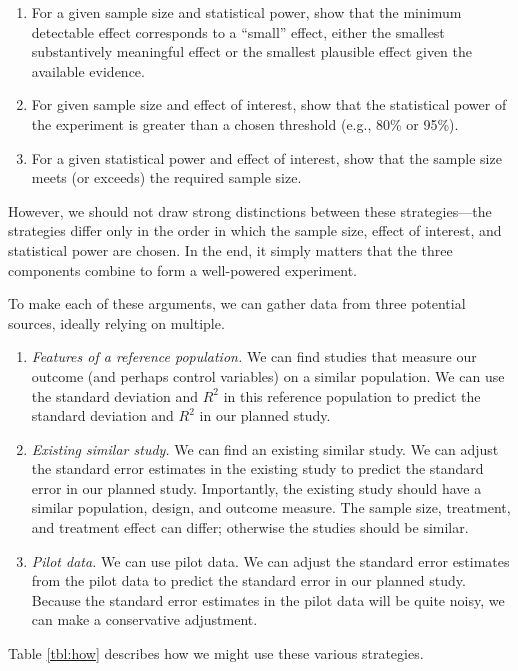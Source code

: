 \documentclass[12pt]{article}
\begin{document}
\begin{enumerate}
\item For a given sample size and statistical power, show that the minimum detectable effect corresponds to a ``small'' effect, either the smallest substantively meaningful effect or the smallest plausible effect given the available evidence.
\item For given sample size and effect of interest, show that the statistical power of the experiment is greater than a chosen threshold (e.g., 80\% or 95\%).
\item For a given statistical power and effect of interest, show that the sample size meets (or exceeds) the required sample size.
\end{enumerate}

\noindent However, we should not draw strong distinctions between these strategies---the strategies differ only in the order in which the sample size, effect of interest, and statistical power are chosen. 
In the end, it simply matters that the three components combine to form a well-powered experiment.

To make each of these arguments, we can gather data from three potential sources, ideally relying on multiple.

\begin{enumerate}
\item \textit{Features of a reference population.} We can find studies that measure our outcome (and perhaps control variables) on a similar population. We can use the standard deviation and $R^2$ in this reference population to predict the standard deviation and $R^2$ in our planned study. 
\item \textit{Existing similar study.} We can find an existing similar study. We can adjust the standard error estimates in the existing study to predict the standard error in our planned study. 
Importantly, the existing study should have a similar population, design, and outcome measure. 
The sample size, treatment, and treatment effect can differ; otherwise the studies should be similar.
\item \textit{Pilot data.} We can use pilot data. We can adjust the standard error estimates from the pilot data to predict the standard error in our planned study. Because the standard error estimates in the pilot data will be quite noisy, we can make a conservative adjustment.
\end{enumerate}

\noindent Table \ref{tbl:how} describes how we might use these various strategies.
\end{document}
